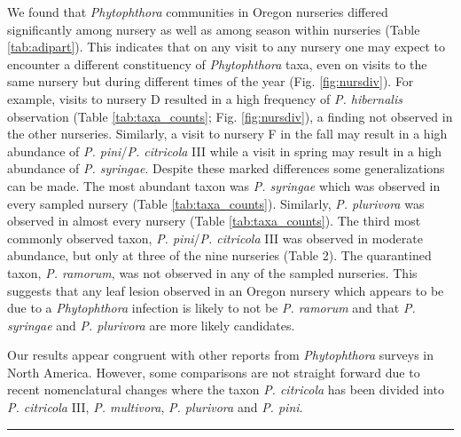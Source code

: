 \documentclass[12pt]{article}
\begin{document}
We found that \emph{Phytophthora} communities in Oregon nurseries differed significantly among nursery as well as among season within nurseries (Table \ref{tab:adipart}).  This indicates that on any visit to any nursery one may expect to encounter a different constituency of \emph{Phytophthora} taxa, even on visits to the same nursery but during different times of the year (Fig. \ref{fig:nursdiv}).  For example, visits to nursery D resulted in a high frequency of \emph{P. hibernalis} observation (Table \ref{tab:taxa_counts}; Fig. \ref{fig:nursdiv}), a finding not observed in the other nurseries.  Similarly, a visit to nursery F in the fall may result in a high abundance of \emph{P. pini}/\emph{P. citricola} III while a visit in spring may result in a high abundance of \emph{P. syringae}.  Despite these marked differences some generalizations can be made.  The most abundant taxon was \emph{P. syringae} which was observed in every sampled nursery (Table \ref{tab:taxa_counts}).  Similarly, \emph{P. plurivora} was observed in almost every nursery (Table \ref{tab:taxa_counts}).  The third most commonly observed taxon, \emph{P. pini}/\emph{P. citricola} III was observed in moderate abundance, but only at three of the nine nurseries (Table 2).  The quarantined taxon, \emph{P. ramorum}, was not observed in any of the sampled nurseries.  This suggests that any leaf lesion observed in an Oregon nursery which appears to be due to a \emph{Phytophthora} infection is likely to not be \emph{P. ramorum} and that \emph{P. syringae} and \emph{P. plurivora} are more likely candidates.

Our results appear congruent with other reports from \emph{Phytophthora} surveys in North America.  However, some comparisons are not straight forward due to recent nomenclatural changes where the taxon \emph{P. citricola} has been divided into \emph{P. citricola} III, \emph{P. multivora}, \emph{P. plurivora}\cite{jung_burgess_2009} and \emph{P. pini}\cite{hong2011}.

\hrule
\end{document}
